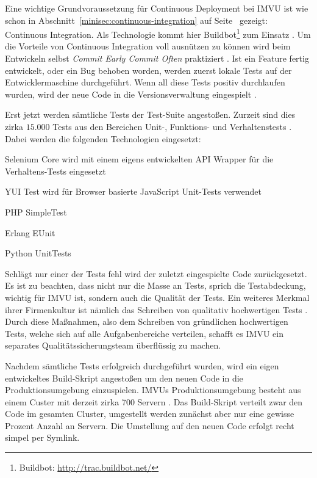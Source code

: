  Eine wichtige Grundvoraussetzung für Continuous Deployment
bei IMVU ist wie schon in Abschnitt~\ref{minisec:continuous-integration} auf
Seite~\pageref{minisec:continuous-integration} gezeigt: Continuous
Integration. Als Technologie kommt hier Buildbot\footnote{Buildbot:
\url{http://trac.buildbot.net/}} zum Einsatz \cite{imvu09}. Um die Vorteile
von Continuous Integration voll ausnützen zu können wird beim Entwickeln
selbst \emph{Commit Early Commit Often} praktiziert \cite{Fitz2009-02-10}. Ist
ein Feature fertig entwickelt, oder ein Bug behoben worden, werden zuerst
lokale Tests auf der Entwicklermaschine durchgeführt. Wenn all diese Tests
positiv durchlaufen wurden, wird der neue Code in die Versionsverwaltung
eingespielt \cite{imvu10}.

Erst jetzt werden sämtliche Tests der Test-Suite angestoßen. Zurzeit sind dies
zirka $15.000$ Tests aus den Bereichen Unit-, Funktions- und Verhaltenstests
\cite{imvu10}. Dabei werden die folgenden Technologien eingesetzt:

\begin{itemize*}
    \item Selenium Core wird mit einem eigens entwickelten API Wrapper für
          die Verhaltens-Tests eingesetzt
    \item YUI Test wird für Browser basierte JavaScript Unit-Tests verwendet
    \item PHP SimpleTest
    \item Erlang EUnit
    \item Python UnitTests
\end{itemize*}

Schlägt nur einer der Tests fehl wird der zuletzt eingespielte Code
zurückgesetzt. Es ist zu beachten, dass nicht nur die Masse an Tests, sprich
die Testabdeckung, wichtig für IMVU ist, sondern auch die Qualität der Tests.
Ein weiteres Merkmal ihrer Firmenkultur ist nämlich das Schreiben von
qualitativ hochwertigen Tests \cite{Fitz2009-02-10}. Durch diese Maßnahmen,
also dem Schreiben von gründlichen hochwertigen Tests, welche sich auf alle
Aufgabenbereiche verteilen, schafft es IMVU ein separates
Qualitätssicherungsteam überflüssig zu machen.

Nachdem sämtliche Tests erfolgreich durchgeführt wurden, wird ein eigen
entwickeltes Build-Skript angestoßen um den neuen Code in die
Produktionsumgebung einzuspielen. IMVUs Produktionsumgebung besteht aus einem
Custer mit derzeit zirka 700 Servern \cite{imvu10}. Das Build-Skript verteilt
zwar den Code im gesamten Cluster, umgestellt werden zunächst aber nur eine
gewisse Prozent Anzahl an Servern. Die Umstellung auf den neuen Code erfolgt
recht simpel per Symlink.

